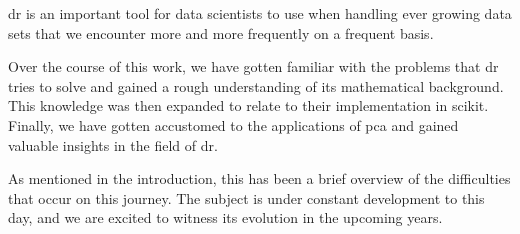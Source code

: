\Acrlong{dr} is an important tool for data scientists to use when handling ever growing data sets that we encounter more and more frequently on a frequent basis.
\bigskip


Over the course of this work, we have gotten familiar with the problems that \gls{dr} tries to solve and gained a rough understanding of its mathematical background.
This knowledge was then expanded to relate to their implementation in \gls{scikit}.
Finally, we have gotten accustomed to the applications of \gls{pca} and gained valuable insights in the field of \acrlong{dr}.
\bigskip


As mentioned in the introduction, this has been a brief overview of the difficulties that occur on this journey.
The subject is under constant development to this day, and we are excited to witness its evolution in the upcoming years.

